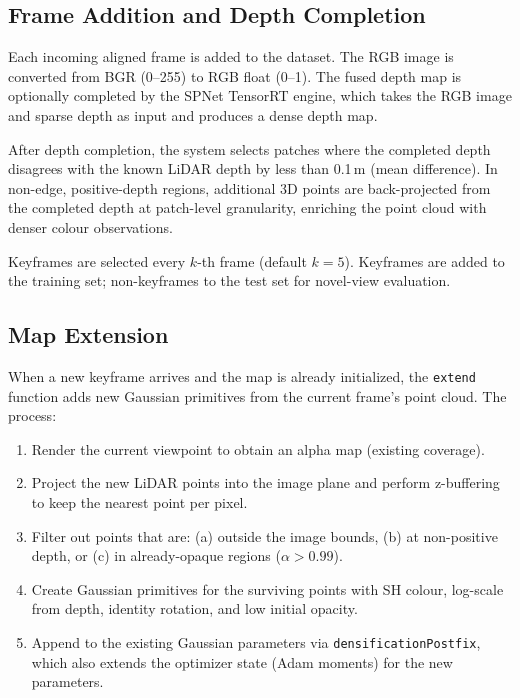 \subsection{Frame Addition and Depth Completion}

Each incoming aligned frame is added to the dataset. The RGB image is
converted from BGR (0--255) to RGB float (0--1). The fused depth map is
optionally completed by the SPNet TensorRT engine, which takes the RGB
image and sparse depth as input and produces a dense depth map.

After depth completion, the system selects patches where the completed
depth disagrees with the known LiDAR depth by less than 0.1\,m (mean
difference). In non-edge, positive-depth regions, additional 3D points
are back-projected from the completed depth at patch-level granularity,
enriching the point cloud with denser colour observations.

Keyframes are selected every $k$-th frame (default $k=5$). Keyframes are
added to the training set; non-keyframes to the test set for novel-view
evaluation.

\subsection{Map Extension}

When a new keyframe arrives and the map is already initialized, the
\texttt{extend} function adds new Gaussian primitives from the current
frame's point cloud. The process:

\begin{enumerate}
    \item Render the current viewpoint to obtain an alpha map
    (existing coverage).
    \item Project the new LiDAR points into the image plane and perform
    z-buffering to keep the nearest point per pixel.
    \item Filter out points that are: (a) outside the image bounds,
    (b) at non-positive depth, or (c) in already-opaque regions
    ($\alpha > 0.99$).
    \item Create Gaussian primitives for the surviving points with SH
    colour, log-scale from depth, identity rotation, and low initial
    opacity.
    \item Append to the existing Gaussian parameters via
    \texttt{densificationPostfix}, which also extends the optimizer state
    (Adam moments) for the new parameters.
\end{enumerate}

